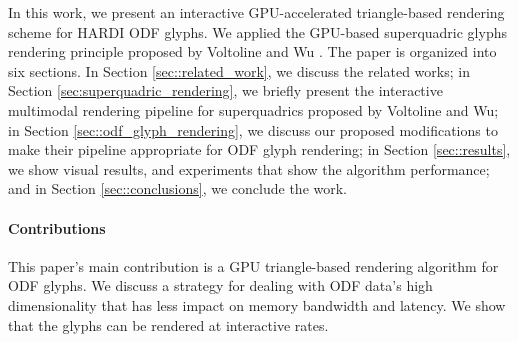 \documentclass[twoside,twocolumn,10pt]{article}
\begin{document}
In this work, we present an interactive GPU-accelerated triangle-based rendering scheme for HARDI ODF glyphs. We applied the GPU-based superquadric glyphs rendering principle proposed by Voltoline and Wu \cite{voltoline2021}.
The paper is organized into six sections. In Section \ref{sec::related_work}, we discuss the related works; in Section \ref{sec:superquadric_rendering}, we briefly present the interactive multimodal rendering pipeline for superquadrics proposed by Voltoline and Wu; in Section \ref{sec::odf_glyph_rendering}, we discuss our proposed modifications to make their pipeline appropriate for ODF glyph rendering; in Section \ref{sec::results}, we show visual results, and experiments that show the algorithm performance; and in Section \ref{sec::conclusions}, we conclude the work.

\paragraph*{\textbf{Contributions}}

This paper's main contribution is a GPU triangle-based rendering algorithm for ODF glyphs. We discuss a strategy for dealing with ODF data's high dimensionality that has less impact on memory bandwidth and latency. We show that the glyphs can be rendered at interactive rates.

\end{document}

